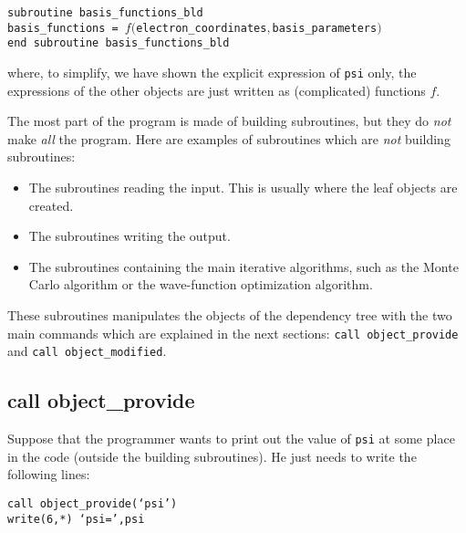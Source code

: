 \documentclass[a4paper,11pt]{article}
\begin{document}
\vspace{0.5cm}
\noindent
{\tt subroutine basis\_functions\_bld\\
basis\_functions  = $f(${\tt electron\_coordinates}$,${\tt basis\_parameters}$)$\\
end subroutine basis\_functions\_bld}

\vspace{0.5cm}
\noindent
where, to simplify, we have shown the explicit expression of {\tt psi} only, the expressions of the other objects are just written as (complicated) functions $f$.

\vspace{0.5cm}
The most part of the program is made of building subroutines, but they do {\it not} make {\it all} the program. Here are examples of subroutines which are {\it not} building subroutines:
\begin{itemize}
\item The subroutines reading the input. This is usually where the leaf objects are created.
\item The subroutines writing the output.
\item The subroutines containing the main iterative algorithms, such as the Monte Carlo algorithm or the wave-function optimization algorithm.
\end{itemize}
These subroutines manipulates the objects of the dependency tree with the two main commands which are explained in the next sections: {\tt call object\_provide} and {\tt call object\_modified}.

\subsection{call object\_provide}

Suppose that the programmer wants to print out the value of {\tt psi} at some place in the code (outside the building subroutines). He just needs to write the following lines:

\vspace{0.5cm}
\noindent
{\tt call object\_provide(`psi')\\
write(6,*) `psi=',psi}
\end{document}
